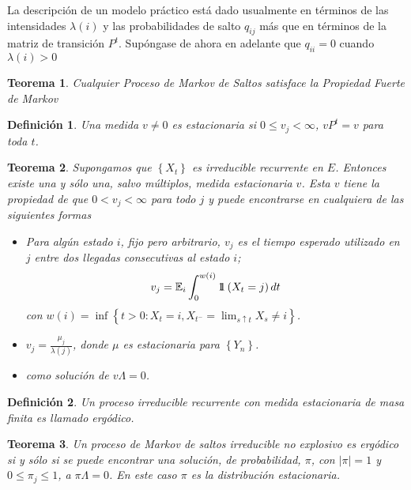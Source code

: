 \documentclass{article}
\newtheorem{Def}{Definición}
\newtheorem{Teo}{Teorema}
\newcommand{\esp}{\mathbb{E}}
\newcommand{\indora}{\mbox{$1$\hspace{-0.8ex}$1$}}
\begin{document}
La descripci\'on de un modelo pr\'actico est\'a dado usualmente en t\'erminos de las intensidades $\lambda\left(i\right)$ y las probabilidades de salto $q_{ij}$ m\'as que en t\'erminos de la matriz de transici\'on $P^{t}$. Sup\'ongase de ahora en adelante que $q_{ii}=0$ cuando $\lambda\left(i\right)>0$

\begin{Teo}
Cualquier Proceso de Markov de Saltos satisface la Propiedad
Fuerte de Markov
\end{Teo}

\begin{Def}
Una medida $v\neq0$ es estacionaria si $0\leq v_{j}<\infty$, $vP^{t}=v$ para toda $t$.
\end{Def}

\begin{Teo}\label{Teo.4.2}
Supongamos que $\left\{X_{t}\right\}$ es irreducible recurrente en $E$. Entonces existe una y s\'olo una, salvo m\'ultiplos, medida estacionaria $v$. Esta $v$ tiene la propiedad de que $0<v_{j}<\infty$ para todo $j$ y puede encontrarse en cualquiera de las siguientes formas

\begin{itemize}
\item[i)] Para alg\'un estado $i$, fijo pero arbitrario, $v_{j}$ es el tiempo esperado utilizado en $j$ entre dos llegadas consecutivas al estado $i$;
\begin{equation}\label{Eq.4.2}
v_{j}=\esp_{i}\int_{0}^{w\left(i\right)}\indora\left(X_{t}=j\right)dt
\end{equation}
con $w\left(i\right)=\inf\left\{t>0:X_{t}=i,X_{t^{-}}=\lim_{s\uparrow t}X_{s}\neq i\right\}$. 
\item[ii)]
$v_{j}=\frac{\mu_{j}}{\lambda\left(j\right)}$, donde $\mu$ es estacionaria para $\left\{Y_{n}\right\}$. \item[iii)] como
soluci\'on de $v\Lambda=0$.
\end{itemize}
\end{Teo}

\begin{Def}
Un proceso irreducible recurrente con medida estacionaria de masa
finita es llamado erg\'odico.
\end{Def}

\begin{Teo}\label{Teo.4.3}
Un proceso de Markov de saltos irreducible no explosivo es erg\'odico si y s\'olo si se puede encontrar una soluci\'on, de probabilidad, $\pi$, con $|\pi|=1$ y $0\leq\pi_{j}\leq1$, a $\pi\Lambda=0$. En este caso $\pi$ es la distribuci\'on estacionaria.
\end{Teo}
\end{document}

